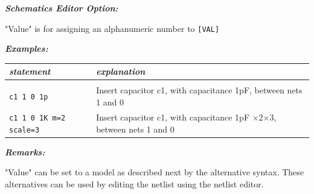 \textbf{\textit{Schematics Editor Option:}}

"\textsf{Value}" is for assigning an alphanumeric number to \texttt{[VAL]}

\textbf{\textit{Examples:}}

\begin{longtable}{l l}
\textit{statement} & \textit{explanation} \\ \hline \\ \vspace{-0.8\parskip} 
\begin{minipage}{15em}\texttt{c1 1 0 1p}\end{minipage} & 
\begin{minipage}{15em}{\small Insert capacitor c1, with capacitance 1pF, between nets 1 and 0}\end{minipage} \\
\begin{minipage}{15em}\texttt{c1 1 0 1K m=2 scale=3}\end{minipage} & 
\begin{minipage}{15em}{\small Insert capacitor c1, with capacitance 1pF $\times$2$\times$3, between nets 1 and 0}\end{minipage}
\end{longtable}

\textbf{\textit{Remarks:}}

"\textsf{Value}" can be set to a model as described next by the alternative syntax. These alternatives can be used by editing the netlist using the netlist editor.






